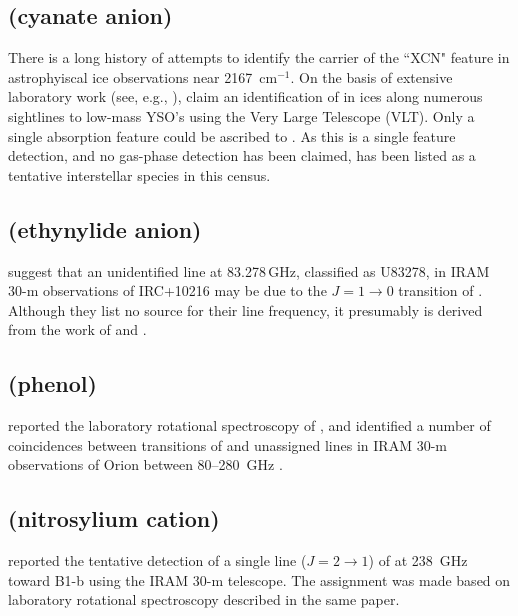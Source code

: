 \documentclass[twocolumn]{aastex631}
\newcommand{\update}[1]{{#1}}
\begin{document}
	\subsection{ (cyanate anion)}
	\label{OCNm}
	
	There is a long history of attempts to identify the carrier of the ``XCN" feature in astrophyiscal ice observations near 2167~cm$^{-1}$.  On the basis of extensive laboratory work (see, e.g., \citealt{Schutte:1997hd}), \citet{vanBroekhuizen:2005ff} claim an identification of  in ices along numerous sightlines to low-mass YSO's using the Very Large Telescope (VLT).  Only a single absorption feature could be ascribed to .  As this is a single feature detection, and no gas-phase detection has been claimed,  has been listed as a tentative interstellar species in this census.
	
	\subsection{\update{ (ethynylide anion)}}
	\label{C2H-}
	
	\update{\citet{Cernicharo:2008wi} suggest that an unidentified line at 83.278\,GHz, classified as U83278, in IRAM 30-m observations of IRC+10216 may be due to the $J = 1\rightarrow0$ transition of \ce{C2H-}.  Although they list no source for their line frequency, it presumably is derived from the work of \citet{2007A&A...464L..33B} and \citet{2008JChPh.129x4305A}.}
	
	\subsection{ (phenol)}
	\label{C6H5OH}
	
	\citet{Kolesnikova:2013hw} reported the laboratory rotational spectroscopy of , and identified a number of coincidences between transitions of  and unassigned lines in IRAM 30-m observations of Orion between 80--280~GHz \citep{Tercero:2012cv}. 
	
	\subsection{ (nitrosylium cation)}
	\label{NOp}
	
	\citet{Cernicharo:2014eq} reported the tentative detection of a single line ($J = 2\rightarrow1$) of  at 238~GHz toward B1-b using the IRAM 30-m telescope.  The assignment was made based on laboratory rotational spectroscopy described in the same paper.
    
\end{document}
